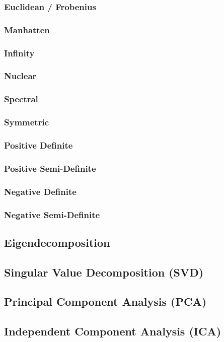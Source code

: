 \documentclass[11pt]{article}
\begin{document}
\subsubsection{Euclidean / Frobenius}
\subsubsection{Manhatten}
\subsubsection{Infinity}
\subsubsection{Nuclear}
\subsubsection{Spectral}
\subsubsection{Symmetric}
\subsubsection{Positive Definite}
\subsubsection{Positive Semi-Definite}
\subsubsection{Negative Definite}
\subsubsection{Negative Semi-Definite}
\subsection{Eigendecomposition}
\subsection{Singular Value Decomposition (SVD)}
\subsection{Principal Component Analysis (PCA)}
\subsection{Independent Component Analysis (ICA)}
\end{document}
